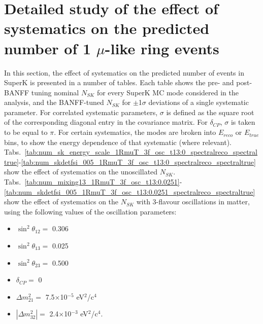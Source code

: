 \clearpage

\section{Detailed study of the effect of systematics on the predicted number of 1 $\mu$-like ring events}
\label{sec:nsk_systematics}

In this section, the effect of systematics on the predicted number of events in SuperK is presented in a number of tables. 
Each table shows the pre- and post-BANFF tuning nominal $N_{SK}$ for every SuperK MC mode considered in the analysis, and 
the BANFF-tuned $N_{SK}$ for $\pm$1$\sigma$ deviations of a single systematic parameter. For correlated systematic parameters, 
$\sigma$ is defined as the square root of the corresponding diagonal entry in the covariance matrix.
For $\delta_{CP}$, $\sigma$ is taken to be equal to $\pi$.
For certain systematics, the modes are broken into $E_{reco}$ or $E_{true}$ bins, to show the energy dependence of that systematic 
(where relevant).
Tabs.\ \ref{tab:num_sk_energy_scale_1RmuT_3f_osc_t13:0_spectralreco_spectraltrue}-\ref{tab:num_skdetfsi_005_1RmuT_3f_osc_t13:0_spectralreco_spectraltrue} 
show the effect of systematics on the unoscillated $N_{SK}$.
Tabs.\ \ref{tab:num_mixing13_1RmuT_3f_osc_t13:0.0251}-\ref{tab:num_skdetfsi_005_1RmuT_3f_osc_t13:0.0251_spectralreco_spectraltrue} 
show the effect of systematics on the $N_{SK}$ with 3-flavour oscillations in matter, using the following values of the oscillation parameters:
\begin{itemize}
\item $\sin^2\theta_{12} = $ 0.306
\item $\sin^2\theta_{13} = $ 0.025
\item $\sin^2\theta_{23} = $ 0.500
\item $\delta_{CP} = $        0
\item $\Delta m^2_{21} = $    7.5$\times$10$^{-5}$ eV$^{2}$/c$^{4}$
\item $|\Delta m^2_{32}| = $  2.4$\times$10$^{-3}$ eV$^{2}$/c$^{4}$.
\end{itemize}

\clearpage





